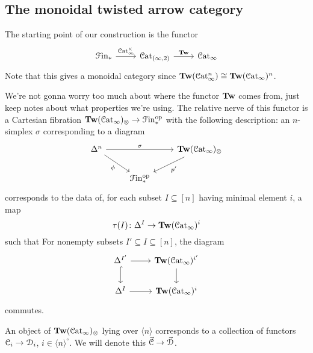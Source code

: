 \documentclass[main.tex]{subfiles}
\begin{document}
\subsection{The monoidal twisted arrow category}
\label{ssc:the_monoidal_twisted_arrow_category}

The starting point of our construction is the functor
\begin{equation*}
  \begin{tikzcd}
    \Finp
    \arrow[r, "\ICat^{\times}"]
    & \Cat_{(\infty, 2)}
    \arrow[r, "\Tw"]
    & \ICat
  \end{tikzcd}
\end{equation*}
Note that this gives a monoidal category since $\mathbf{Tw}(\mathcal{C}\mathrm{at}_{\infty}^{n})\cong \mathbf{Tw}(\mathcal{C}\mathrm{at}_{\infty})^{n}$.

We're not gonna worry too much about where the functor $\mathbf{Tw}$ comes from, just keep notes about what properties we're using. The relative nerve of this functor is a Cartesian fibration $\mathbf{Tw}(\mathcal{C}\mathrm{at}_{\infty})_{\otimes} \to \mathcal{F}\mathrm{in}_{*}^{\mathrm{op}}$ with the following description: an $n$-simplex $\sigma$ corresponding to a diagram
\begin{equation*}
  \begin{tikzcd}
    \Delta^{n}
    \arrow[rr, "\sigma"]
    \arrow[dr, swap, "\phi"]
    && \Tw(\ICat)_{\otimes}
    \arrow[dl, "p'"]
    \\
    & \Finp\op
  \end{tikzcd}
\end{equation*}
corresponds to the data of, for each subset $I \subseteq [n]$ having minimal element $i$, a map
\begin{equation*}
  \tau(I)\colon \Delta^{I} \to \mathbf{Tw}(\mathcal{C}\mathrm{at}_{\infty})^{i}
\end{equation*}
such that For nonempty subsets $I' \subseteq I \subseteq [n]$, the diagram
\begin{equation*}
  \begin{tikzcd}
    \Delta^{I'}
    \arrow[r]
    \arrow[d, hook]
    & \Tw(\ICat)^{i'}
    \arrow[d]
    \\
    \Delta^{I}
    \arrow[r]
    & \Tw(\ICat)^{i}
  \end{tikzcd}
\end{equation*}
commutes.

\begin{example}
  An object of $\mathbf{Tw}(\mathcal{C}\mathrm{at}_{\infty})_{\otimes}$ lying over $\langle n \rangle$ corresponds to a collection of functors $\mathcal{C}_{i} \to \mathcal{D}_{i}$, $i \in \langle n \rangle^{\circ}$. We will denote this $\vec{\mathcal{C}} \to \vec{\mathcal{D}}$.
\end{example}
\end{document}
